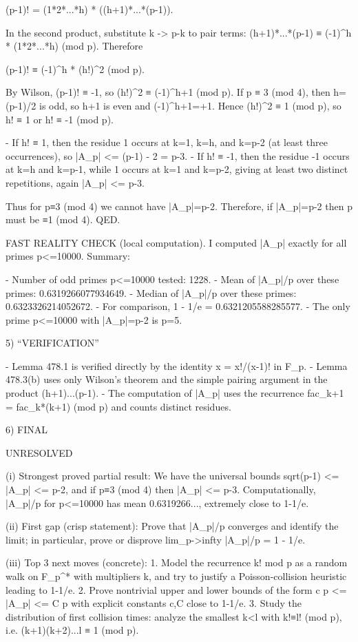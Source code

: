     (p-1)! = (1*2*...*h) * ((h+1)*...*(p-1)).

In the second product, substitute k -> p-k to pair terms: (h+1)*...*(p-1) ≡ (-1)^h * (1*2*...*h) (mod p). Therefore

    (p-1)! ≡ (-1)^h * (h!)^2  (mod p).

By Wilson, (p-1)! ≡ -1, so (h!)^2 ≡ (-1)^{h+1} (mod p).
If p ≡ 3 (mod 4), then h=(p-1)/2 is odd, so h+1 is even and (-1)^{h+1}=+1. Hence (h!)^2 ≡ 1 (mod p), so h! ≡ 1 or h! ≡ -1 (mod p).

- If h! ≡ 1, then the residue 1 occurs at k=1, k=h, and k=p-2 (at least three occurrences), so |A_p| <= (p-1) - 2 = p-3.
- If h! ≡ -1, then the residue -1 occurs at k=h and k=p-1, while 1 occurs at k=1 and k=p-2, giving at least two distinct repetitions, again |A_p| <= p-3.

Thus for p≡3 (mod 4) we cannot have |A_p|=p-2. Therefore, if |A_p|=p-2 then p must be ≡1 (mod 4).  QED.

FAST REALITY CHECK (local computation).
I computed |A_p| exactly for all primes p<=10000. Summary:

- Number of odd primes p<=10000 tested: 1228.
- Mean of |A_p|/p over these primes: 0.6319266077934649.
- Median of |A_p|/p over these primes: 0.6323326214052672.
- For comparison, 1 - 1/e = 0.6321205588285577.
- The only prime p<=10000 with |A_p|=p-2 is p=5.

5) “VERIFICATION”

- Lemma 478.1 is verified directly by the identity x = x!/(x-1)! in F_p.
- Lemma 478.3(b) uses only Wilson's theorem and the simple pairing argument in the product (h+1)...(p-1).
- The computation of |A_p| uses the recurrence fac_{k+1} = fac_k*(k+1) (mod p) and counts distinct residues.

6) FINAL

UNRESOLVED

(i) Strongest proved partial result:
We have the universal bounds sqrt(p-1) <= |A_p| <= p-2, and if p≡3 (mod 4) then |A_p| <= p-3. Computationally, |A_p|/p for p<=10000 has mean 0.6319266..., extremely close to 1-1/e.

(ii) First gap (crisp statement):
Prove that |A_p|/p converges and identify the limit; in particular, prove or disprove lim_{p->infty} |A_p|/p = 1 - 1/e.

(iii) Top 3 next moves (concrete):
1. Model the recurrence k! mod p as a random walk on F_p^* with multipliers k, and try to justify a Poisson-collision heuristic leading to 1-1/e.
2. Prove nontrivial upper and lower bounds of the form c p <= |A_p| <= C p with explicit constants c,C close to 1-1/e.
3. Study the distribution of first collision times: analyze the smallest k<l with k!≡l! (mod p), i.e. (k+1)(k+2)...l ≡ 1 (mod p).

